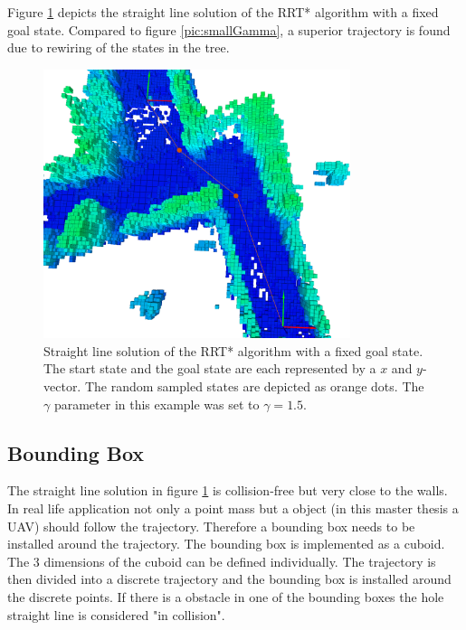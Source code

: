 Figure \ref{pic:smallBBX} depicts the straight line solution of the RRT* algorithm with a fixed goal state. Compared to figure \ref{pic:smallGamma}, a superior trajectory is found due to rewiring of the states in the tree.

\begin{figure}[H]
   \centering
   \includegraphics[trim = 50mm 0mm 30mm 0mm,clip,width=0.8\textwidth]{pics/smallBBXP.png}
   \caption{Straight line solution of the RRT* algorithm with a fixed goal state. The start state and the goal state are each represented by a $x$ and  $y$-vector. The random sampled states are depicted as orange dots. The $\gamma$ parameter in this example was set to $\gamma = 1.5$.}
   \label{pic:smallBBX}
\end{figure}


\subsection{Bounding Box}\label{sec:bbx}

The straight line solution in figure \ref{pic:smallBBX} is collision-free but very close to the walls. In real life application not only a point mass but a object (in this master thesis a UAV) should follow the trajectory. Therefore a bounding box needs to be installed around the trajectory. \newline
The bounding box is implemented as a cuboid. The 3 dimensions of the cuboid can be defined individually. The trajectory is then divided into a discrete trajectory and the bounding box is installed around the discrete points. If there is a obstacle in one of the bounding boxes the hole straight line is considered "in collision". \newline

